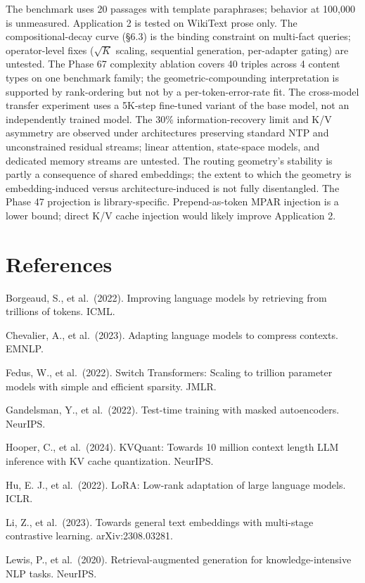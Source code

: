 The benchmark uses 20 passages with template paraphrases; behavior at 100,000 is unmeasured. Application 2 is tested on WikiText prose only. The compositional-decay curve (\S 6.3) is the binding constraint on multi-fact queries; operator-level fixes (\(\sqrt{K}\) scaling, sequential generation, per-adapter gating) are untested. The Phase 67 complexity ablation covers 40 triples across 4 content types on one benchmark family; the geometric-compounding interpretation is supported by rank-ordering but not by a per-token-error-rate fit. The cross-model transfer experiment uses a 5K-step fine-tuned variant of the base model, not an independently trained model. The 30\% information-recovery limit and K/V asymmetry are observed under architectures preserving standard NTP and unconstrained residual streams; linear attention, state-space models, and dedicated memory streams are untested. The routing geometry's stability is partly a consequence of shared embeddings; the extent to which the geometry is embedding-induced versus architecture-induced is not fully disentangled. The Phase 47 projection is library-specific. Prepend-as-token MPAR injection is a lower bound; direct K/V cache injection would likely improve Application 2.

\section{References}\label{references}

Borgeaud, S., et al.~(2022). Improving language models by retrieving from trillions of tokens. ICML.

Chevalier, A., et al.~(2023). Adapting language models to compress contexts. EMNLP.

Fedus, W., et al.~(2022). Switch Transformers: Scaling to trillion parameter models with simple and efficient sparsity. JMLR.

Gandelsman, Y., et al.~(2022). Test-time training with masked autoencoders. NeurIPS.

Hooper, C., et al.~(2024). KVQuant: Towards 10 million context length LLM inference with KV cache quantization. NeurIPS.

Hu, E. J., et al.~(2022). LoRA: Low-rank adaptation of large language models. ICLR.

Li, Z., et al.~(2023). Towards general text embeddings with multi-stage contrastive learning. arXiv:2308.03281.

Lewis, P., et al.~(2020). Retrieval-augmented generation for knowledge-intensive NLP tasks. NeurIPS.

